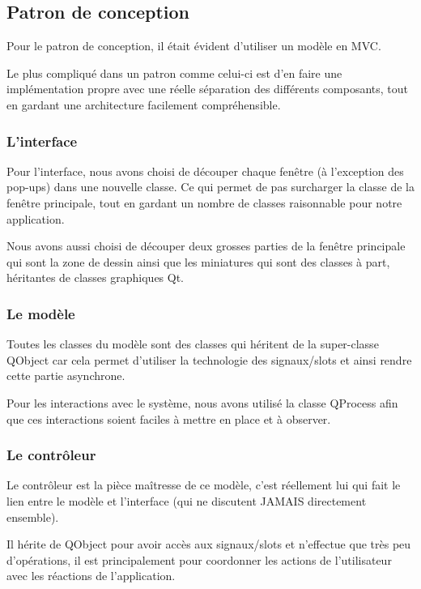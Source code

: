 \subsection{Patron de conception}

Pour le patron de conception, il était évident d'utiliser un modèle en MVC.

Le plus compliqué dans un patron comme celui-ci est d'en faire une implémentation propre avec une réelle séparation des différents composants, tout en gardant une architecture facilement compréhensible.

\subsubsection{L'interface}

Pour l'interface, nous avons choisi de découper chaque fenêtre (à l'exception des pop-ups) dans une nouvelle classe. Ce qui permet 
de pas surcharger la classe de la fenêtre principale, tout en gardant un nombre de classes raisonnable pour notre application.

Nous avons aussi choisi de découper deux grosses parties de la fenêtre principale qui sont la zone de dessin ainsi que les miniatures qui sont des classes à part, héritantes de classes graphiques Qt.

\subsubsection{Le modèle}

Toutes les classes du modèle sont des classes qui héritent de la super-classe QObject car cela permet d'utiliser la technologie des  signaux/slots et ainsi rendre cette partie asynchrone.

Pour les interactions avec le système, nous avons utilisé la classe QProcess afin que ces interactions soient faciles à mettre en place et à observer.

\subsubsection{Le contrôleur}

Le contrôleur est la pièce maîtresse de ce modèle, c'est réellement lui qui fait le lien entre le modèle et l'interface (qui ne discutent JAMAIS directement ensemble).

Il hérite de QObject pour avoir accès aux signaux/slots et n'effectue que très peu d'opérations, il est principalement pour coordonner les actions de l'utilisateur avec les réactions de l'application.

